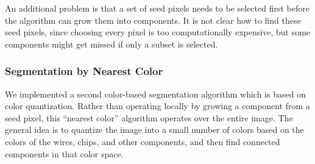 \documentclass[10pt,twocolumn,letterpaper]{article}
\begin{document}
An additional problem is that a set of seed pixels needs to be
selected first before the algorithm can grow them into components. It
is not clear how to find these seed pixels, since choosing every pixel
is too computationally expensive, but some components might get missed if only a
subset is selected.

\subsubsection{Segmentation by Nearest Color}

We implemented a second color-based segmentation algorithm which is
based on color quantization. Rather than operating locally by growing
a component from a seed pixel, this ``nearest color'' algorithm
operates over the entire image. The general idea is to quantize the
image into a small number of colors based on the colors of the
wires, chips, and other components, and then find connected components
in that color space.
\end{document}
